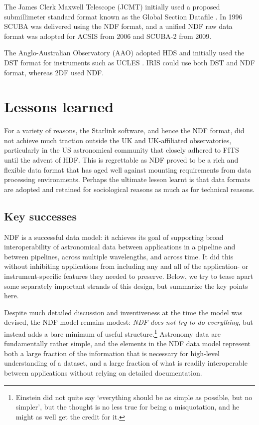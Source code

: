 \documentclass[final,authoryear,5p,times,twocolumn]{elsarticle}
\begin{document}
The James Clerk Maxwell Telescope (JCMT) initially used a proposed
submillimeter standard format known as the Global Section Datafile
\citep[GSD;][formerly General Single Dish Data]{sun229}. In 1996 SCUBA
\citep{1999MNRAS.303..659H} was delivered using the NDF format, and a
unified NDF raw data format was adopted for ACSIS
\citep{2009MNRAS.399.1026B} from 2006 and SCUBA-2
\citep{2013MNRAS.430.2513H} from 2009.

The Anglo-Australian Observatory (AAO) adopted HDS and initially used
the DST format for instruments such as UCLES
\citep{1990SPIE.1235..562D}. IRIS \citep{1993PASAu..10..298A} could
use both DST and NDF format, whereas 2DF \citep{2002MNRAS.333..279L}
used NDF.

\section{Lessons learned}
\label{sec:lessons}

For a variety of reasons, the Starlink software, and hence the NDF
format, did not achieve much traction outside the UK and UK-affiliated
observatories, particularly in
the US astronomical community that closely adhered to FITS until the
advent of HDF. This is regrettable as NDF proved to be a rich and
flexible data format that has aged well against mounting requirements
from data processing environments. Perhaps the ultimate lesson learnt
is that data formats are adopted and retained for sociological reasons
as much as for technical reasons.

\subsection{Key successes}
\label{sec:success}

NDF is a successful data model: it achieves its goal of supporting
broad interoperability of astronomical data between applications in a
pipeline and between pipelines, across multiple wavelengths, and
across time.  It did this without inhibiting applications from
including any and all of the application- or instrument-specific
features they needed to preserve.  Below, we try to tease apart some
separately important strands of this design, but summarize the key
points here.

Despite much detailed discussion and inventiveness at the time the
model was devised, the NDF model remains modest: \emph{NDF does not
  try to do everything}, but instead adds a bare minimum of useful
structure.\footnote{Einstein did not quite say `everything should be
  as simple as possible, but no simpler', but the thought is no less
  true for being a misquotation, and he might as well get the credit
  for it.}  Astronomy data are fundamentally rather simple, and the
elements in the NDF data model represent both a large fraction of the
information that is necessary for high-level understanding of a
dataset, and a large fraction of what is readily interoperable between
applications without relying on detailed documentation.
\end{document}
